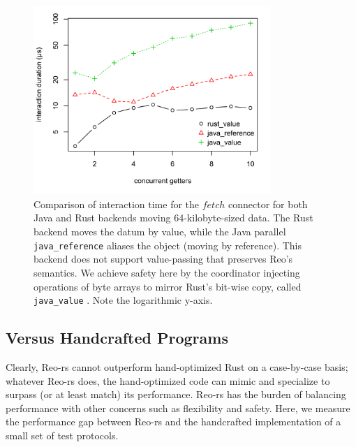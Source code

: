 \begin{figure}
	\centering
	\includegraphics[width=0.80\textwidth]{experiments/rust_v_java_2.png}
	\caption[Java vs.\ Rust interaction time for large values.]{Comparison of interaction time for the $fetch$ connector for both Java and Rust backends moving 64-kilobyte-sized data. The Rust backend moves the datum by value, while the Java parallel \texttt{java\_reference}  aliases the object (moving by reference). This backend does not support value-passing that preserves Reo's semantics. We achieve safety here by the coordinator injecting  operations of byte arrays to mirror Rust's bit-wise copy, called \texttt{java\_value} . Note the logarithmic y-axis.}
	\label{fig:rust_v_java_2}
\end{figure}

\subsection{Versus Handcrafted Programs}

Clearly, Reo-rs cannot outperform hand-optimized Rust on a case-by-case basis; whatever Reo-rs does, the hand-optimized code can mimic and specialize to surpass (or at least match) its performance. Reo-rs has the burden of balancing performance with other concerns such as flexibility and safety. Here, we measure the performance gap between Reo-rs and the handcrafted implementation of a small set of test protocols.

